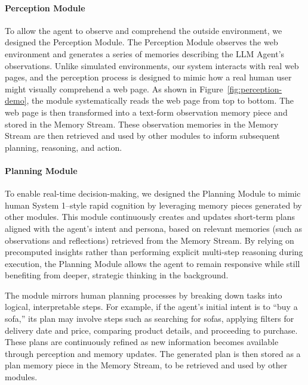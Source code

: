 \documentclass[manuscript,review,anonymous]{acmart}
\DeclareRobustCommand{\note}[1]{{\sethlcolor{orange!30!white}\hl{#1}}}
\begin{document}
\paragraph{Perception Module}
\label{sec:perception-module}
To allow the agent to observe and comprehend the outside environment, we designed the Perception Module.
The Perception Module observes the web environment and generates a series of memories describing the LLM Agent's observations.
Unlike simulated environments, our system interacts with real web pages, and the perception process is designed to mimic how a real human user might visually comprehend a web page.
As shown in Figure~\ref{fig:perception-demo}, the module systematically reads the web page from top to bottom.
The web page is then transformed into a text-form observation memory piece and stored in the Memory Stream.
These observation memories in the Memory Stream are then retrieved and used by other modules to inform subsequent planning, reasoning, and action.

\paragraph{Planning Module} 
\label{sec:planning-module}
To enable real-time decision-making, we designed the Planning Module to mimic human System 1–style rapid cognition by leveraging memory pieces generated by other modules.
This module continuously creates and updates short-term plans aligned with the agent’s intent and persona, based on relevant memories (such as observations and reflections) retrieved from the Memory Stream.
By relying on precomputed insights rather than performing explicit multi-step reasoning during execution, the Planning Module allows the agent to remain responsive while still benefiting from deeper, strategic thinking in the background.

The module mirrors human planning processes by breaking down tasks into logical, interpretable steps. For example, if the agent's initial intent is to ``buy a sofa,'' its plan may involve steps such as searching for sofas, applying filters for delivery date and price, comparing product details, and proceeding to purchase.
These plans are continuously refined as new information becomes available through perception and memory updates.
The generated plan is then stored as a plan memory piece in the Memory Stream, to be retrieved and used by other modules.
\end{document}
